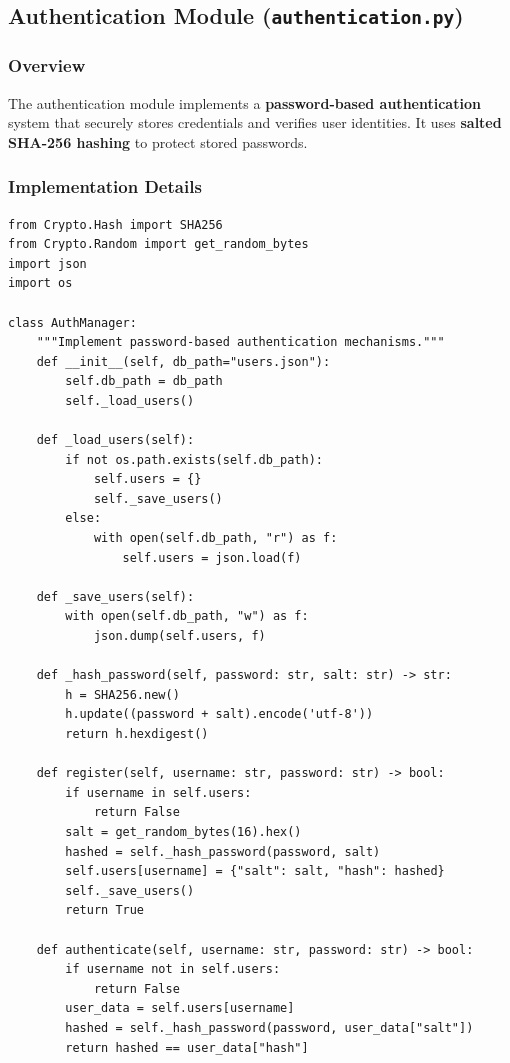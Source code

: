 \documentclass[12pt,a4paper]{article}
\begin{document}
\subsection{Authentication Module (\texttt{authentication.py})}

\subsubsection{Overview}
The authentication module implements a \textbf{password-based authentication} system that securely stores credentials and verifies user identities. It uses \textbf{salted SHA-256 hashing} to protect stored passwords.

\subsubsection{Implementation Details}

\begin{lstlisting}[caption={Authentication Module – \texttt{authentication.py}}]
from Crypto.Hash import SHA256
from Crypto.Random import get_random_bytes
import json
import os

class AuthManager:
    """Implement password-based authentication mechanisms."""
    def __init__(self, db_path="users.json"):
        self.db_path = db_path
        self._load_users()

    def _load_users(self):
        if not os.path.exists(self.db_path):
            self.users = {}
            self._save_users()
        else:
            with open(self.db_path, "r") as f:
                self.users = json.load(f)

    def _save_users(self):
        with open(self.db_path, "w") as f:
            json.dump(self.users, f)

    def _hash_password(self, password: str, salt: str) -> str:
        h = SHA256.new()
        h.update((password + salt).encode('utf-8'))
        return h.hexdigest()

    def register(self, username: str, password: str) -> bool:
        if username in self.users:
            return False
        salt = get_random_bytes(16).hex()
        hashed = self._hash_password(password, salt)
        self.users[username] = {"salt": salt, "hash": hashed}
        self._save_users()
        return True

    def authenticate(self, username: str, password: str) -> bool:
        if username not in self.users:
            return False
        user_data = self.users[username]
        hashed = self._hash_password(password, user_data["salt"])
        return hashed == user_data["hash"]
\end{lstlisting}
\end{document}
